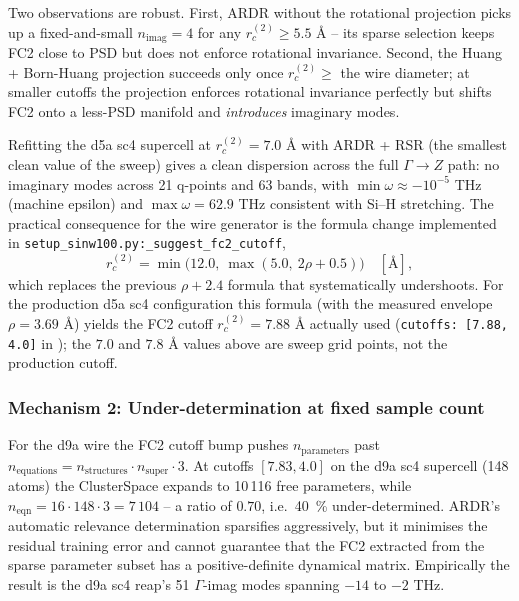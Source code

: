 Two observations are robust.  First, ARDR without the rotational
projection picks up a fixed-and-small $n_\mathrm{imag}=4$ for any
$r_c^{(2)} \geq 5.5$ Å -- its sparse selection keeps FC2 close to PSD
but does not enforce rotational invariance.  Second, the Huang +
Born-Huang projection succeeds only once $r_c^{(2)} \geq$ the wire
diameter; at smaller cutoffs the projection enforces rotational
invariance perfectly but shifts FC2 onto a less-PSD manifold and
\emph{introduces} imaginary modes.

Refitting the d5a sc4 supercell at $r_c^{(2)} = 7.0$ Å with ARDR + RSR
(the smallest clean value of the sweep) gives a clean dispersion across
the full $\Gamma\to Z$ path: no
imaginary modes across 21 q-points and 63 bands, with
$\min \omega \approx -10^{-5}$ THz (machine epsilon) and
$\max \omega = 62.9$ THz consistent with Si--H stretching.  The
practical consequence for the wire generator is the formula change
implemented in \texttt{setup\_sinw100.py:\_suggest\_fc2\_cutoff},
\begin{equation}\label{eq:suggested_cutoff}
  r_c^{(2)} = \min\bigl(12.0,\ \max(5.0,\ 2\rho + 0.5)\bigr) \quad [\text{\AA}],
\end{equation}
which replaces the previous $\rho + 2.4$ formula that systematically
undershoots.  For the production d5a sc4 configuration this formula
(with the measured envelope $\rho=3.69$ Å) yields the FC2 cutoff
$r_c^{(2)} = 7.88$ Å actually used (\texttt{cutoffs: [7.88, 4.0]} in
); the $7.0$ and
$7.8$ Å values above are sweep grid points, not the production cutoff.

\subsubsection{Mechanism 2: Under-determination at fixed sample count}
\label{sec:underdet}

For the d9a wire the FC2 cutoff bump pushes
$n_\mathrm{parameters}$ past
$n_\mathrm{equations} = n_\mathrm{structures} \cdot n_\mathrm{super}\cdot 3$.
At cutoffs $[7.83, 4.0]$ on the d9a sc4 supercell (148 atoms) the
ClusterSpace expands to 10\,116 free parameters, while
$n_\mathrm{eqn} = 16\cdot148\cdot3 = 7\,104$ -- a ratio of $0.70$, i.e.\
40~\% under-determined.  ARDR's automatic relevance determination
\cite{eriksson_hiphive_2019} sparsifies aggressively, but it minimises
the residual training error and cannot guarantee that the FC2
extracted from the sparse parameter subset has a positive-definite
dynamical matrix.  Empirically the result is the d9a sc4 reap's 51
$\Gamma$-imag modes spanning $-14$ to $-2$ THz.

